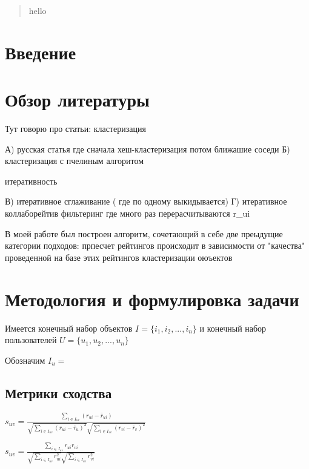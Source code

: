 \documentclass[12pt]{article} %
\begin{document}
\begin{abstract}
hello
\end{abstract}

\section{Введение}
\par

\section{Обзор литературы}


Тут говорю про статьи:
кластеризация

А) русская статья где сначала хеш-кластеризация потом ближашие соседи
Б) кластеризация с пчелиным алгоритом

итеративность

В) итеративное сглаживание ( где по одному выкидывается)
Г) итеративное коллаборейтив фильтеринг где много раз перерасчитываются r_{ui} 

В моей работе был построен алгоритм, сочетающий в себе две преыдущие категории подходов: прпесчет рейтингов происходит в зависимости от "качества" проведенной
на базе этих рейтингов кластеризации оюъектов


\section{Методология и формулировка задачи}
\par
Имеется конечный набор объектов $I=\{i_{1}, i_{2}, ..., i_{n}\}$ и конечный набор пользователей $U=\{u_{1}, u_{2}, ..., u_{n}\}$

\par
Обозначим $I_{u}= $

\subsection{Метрики сходства}

$s_{uv} = \frac{\sum_{i \in I_{uv}} (r_{ui} - \bar{r}_{ui})}{\sqrt{\sum_{i \in I_{uv}}  (r_{ui} - \bar{r}_{u})^2} \sqrt{\sum_{i \in I_{uv}}  (r_{vi} - \bar{r}_{v})^2}}$

\vspace*{2\baselineskip} %

$s_{uv} = \frac{\sum_{i \in I_{uv}} r_{ui}r_{vi}} {\sqrt{\sum_{i \in I_{uv}} r_{ui}^2} \sqrt{\sum_{i \in I_{uv}} r_{vi}^2}}$
\end{document}

